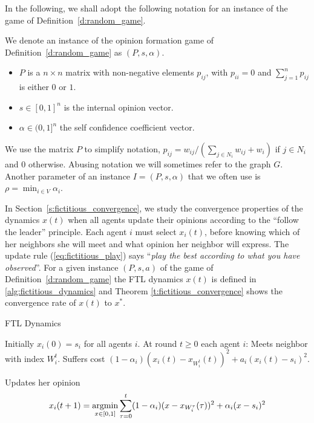In the following, we shall adopt the following notation for
an instance of the game of Definition~\ref{d:random_game}.
%
\begin{definition}\label{d:instance}
  We denote an instance of the opinion formation game of Definition~\ref{d:random_game}
  as $(P,s,\alpha)$.
  \begin{itemize}
    \item $P$ is a $n \times n$  matrix with non-negative elements $p_{ij}$,
      with $p_{ii}=0$ and $\sum_{j=1}^n p_{ij}$ is either $0$ or $1$.
    \item $s \in [0,1]^n$ is the internal opinion vector.
    \item $\alpha \in (0,1]^n$ the self confidence coefficient vector.
  \end{itemize}
\end{definition}
%
We use the matrix $P$ to simplify notation, $p_{ij} = w_{ij}/(\sum_{j \in N_i}w_{ij}+w_i)$
if $j \in N_i$ and $0$ otherwise.
Abusing notation we will sometimes refer to the graph $G$.
Another parameter of an instance $I=(P,s,\alpha)$ that we often use is
$\rho=\min_{i \in V}\alpha_i$.

In Section~\ref{s:fictitious_convergence}, we study the convergence properties
of the dynamics $x(t)$ when all agents update their opinions
according to the \enquote{follow the leader} principle.
Each agent $i$ must select $x_i(t)$, before knowing which of her neighbors she
will meet and what opinion her neighbor will express. The update rule
(\ref{eq:fictitious_play}) says \enquote{\emph{play the best according to what you have observed}}.
For a given instance $(P,s,a)$ of the game of Definition~\ref{d:random_game}
the FTL dynamics $x(t)$ is defined in \ref{alg:fictitious_dynamics} and
Theorem \ref{t:fictitious_convergence} shows the convergence rate of $x(t)$ to $x^*$.
%
\begin{algorithm}
  \caption{FTL Dynamics}
  \label{alg:fictitious_dynamics}
  \begin{algorithmic}[1]
    \STATE Initially $x_i(0) = s_i$ for all agents $i$.
    \STATE At round $t\geq 0$ each agent $i$:
    \bindent
    \STATE Meets neighbor with index $W_i^t$.
    \STATE Suffers cost \((1-\alpha_i) (x_i(t) - x_{W_i^t}(t))^2 + a_i (x_i(t) - s_i)^2\).
  \item Updates her opinion
    \begin{equation}\label{eq:fictitious_play}
      x_i(t+1) =
      \operatorname*{argmin}_{x \in [0,1]}
      \sum_{\tau=0}^{t}(1-\alpha_i)(x-x_{W_i^\tau}(\tau))^2+\alpha_i(x-s_i)^2
    \end{equation}
    \eindent
  \end{algorithmic}
\end{algorithm}
%

